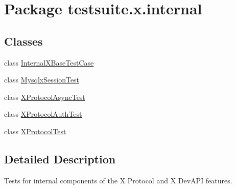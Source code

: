 \hypertarget{namespacetestsuite_1_1x_1_1internal}{}\section{Package testsuite.\+x.\+internal}
\label{namespacetestsuite_1_1x_1_1internal}
\subsection*{Classes}
\begin{DoxyCompactItemize}
\item 
class \mbox{\hyperlink{classtestsuite_1_1x_1_1internal_1_1_internal_x_base_test_case}{Internal\+X\+Base\+Test\+Case}}
\item 
class \mbox{\hyperlink{classtestsuite_1_1x_1_1internal_1_1_mysqlx_session_test}{Mysqlx\+Session\+Test}}
\item 
class \mbox{\hyperlink{classtestsuite_1_1x_1_1internal_1_1_x_protocol_async_test}{X\+Protocol\+Async\+Test}}
\item 
class \mbox{\hyperlink{classtestsuite_1_1x_1_1internal_1_1_x_protocol_auth_test}{X\+Protocol\+Auth\+Test}}
\item 
class \mbox{\hyperlink{classtestsuite_1_1x_1_1internal_1_1_x_protocol_test}{X\+Protocol\+Test}}
\end{DoxyCompactItemize}


\subsection{Detailed Description}
Tests for internal components of the X Protocol and X Dev\+A\+PI features. 